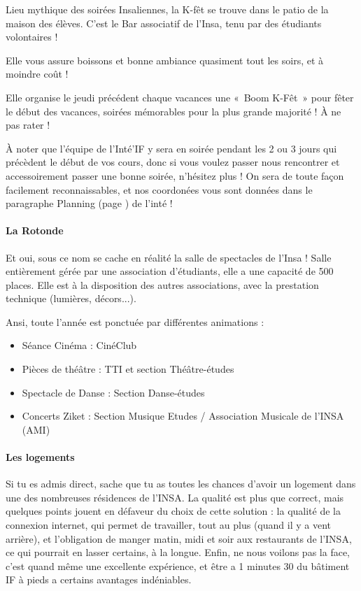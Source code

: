 Lieu mythique des soirées Insaliennes, la K-fêt se trouve dans le patio de
la maison des élèves. C'est le Bar associatif de l'Insa, tenu par des
étudiants volontaires !

Elle vous assure boissons et bonne ambiance quasiment tout les soirs, et à
moindre coût !

Elle organise le jeudi précédent chaque vacances une «~Boom K-Fêt~» pour fêter
le début des vacances, soirées mémorables pour la plus grande majorité ! À ne
pas rater !

À noter que l'équipe de l'Inté'IF y sera en soirée pendant les 2 ou 3 jours qui
précèdent le début de vos cours, donc si vous voulez passer nous rencontrer et
accessoirement passer une bonne soirée, n'hésitez plus ! On sera de toute façon
facilement reconnaissables, et nos coordonées vous sont données dans le
paragraphe Planning (page \pageref{rplanning}) de l'inté !

\paragraph{La Rotonde}
Et oui, sous ce nom se cache en réalité la salle de spectacles de l'Insa !
Salle entièrement gérée par une association d'étudiants, elle a une
capacité de 500 places. Elle est à la disposition des autres associations, avec
la prestation technique (lumières, décors...).

Ansi, toute l'année est ponctuée par différentes animations :
\begin{itemize}
\item  Séance Cinéma : CinéClub
\item  Pièces de théâtre : TTI et section Théâtre-études
\item  Spectacle de Danse : Section Danse-études
\item  Concerts Ziket : Section Musique Etudes / Association Musicale de l'INSA (AMI) 
\end{itemize}

\paragraph{Les logements}
Si tu es admis direct, sache que tu as toutes les chances d'avoir un logement
dans une des nombreuses résidences de l'INSA. La qualité est plus que correct,
mais quelques points jouent en défaveur du choix de cette solution : la qualité
de la connexion internet, qui permet de travailler, tout au plus (quand il y a
vent arrière), et l'obligation de manger matin, midi et soir aux
restaurants de l'INSA, ce qui pourrait en lasser certains, à la longue.
Enfin, ne nous voilons pas la face, c'est quand même une excellente expérience,
et être a 1 minutes 30 du bâtiment IF à pieds a certains avantages
indéniables.

